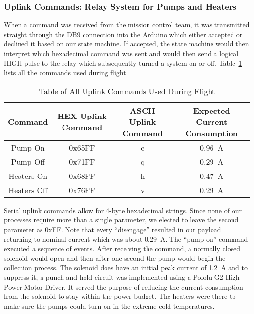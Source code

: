 \subsubsection{Uplink Commands: Relay System for Pumps and Heaters}

When a command was received from the mission control team, it was transmitted straight through the DB9 connection into the Arduino which either accepted or declined it based on our state machine.  If accepted, the state machine would then interpret which hexadecimal command was sent and would then send a logical HIGH pulse to the relay which subsequently turned a system on or off.  Table~\ref{tab:All-Commands} lists all the commands used during flight.

\begin{table}[!ht]
\centering
\caption{Table of All Uplink Commands Used During Flight} 
\label{tab:All-Commands}
\bigskip
\begin{tabular}{|c|c|c|c|}
\hline
\multicolumn{1}{|c|}{\bfseries Command} & \multicolumn{1}{c|}{\bfseries HEX Uplink Command} &  \multicolumn{1}{c|}{\bfseries ASCII Uplink Command} & \multicolumn{1}{c|}{\bfseries Expected Current Consumption} \\
\hline
    Pump On     	& 0x65FF 	& e	 & \SI{0.96}{\ampere}   \\ \hline
    Pump Off    	& 0x71FF 	& q	 & \SI{0.29}{\ampere}    \\ \hline
    Heaters On  	& 0x68FF 	& h	 & \SI{0.47}{\ampere}    \\ \hline    
    Heaters Off 	& 0x76FF 	& v	 & \SI{0.29}{\ampere}    \\ \hline
\end{tabular}
\medskip
\end{table}

Serial uplink commands allow for 4-byte hexadecimal strings.  Since none of our processes require more than a single parameter, we elected to leave the second parameter as 0xFF.  Note that every ``disengage'' resulted in our payload returning to nominal current which was about \SI{0.29}{\ampere}.  The ``pump on'' command executed a sequence of events. After receiving the command, a normally closed solenoid would open and then after one second the pump would begin the collection process.  The solenoid does have an initial peak current of \SI{1.2}{\ampere} and to suppress it, a punch-and-hold circuit was implemented using a Pololu G2 High Power Motor Driver.  It served the purpose of reducing  the current consumption from the solenoid to stay within the power budget.  The heaters were there to make sure the pumps could turn on in the extreme cold temperatures.  

